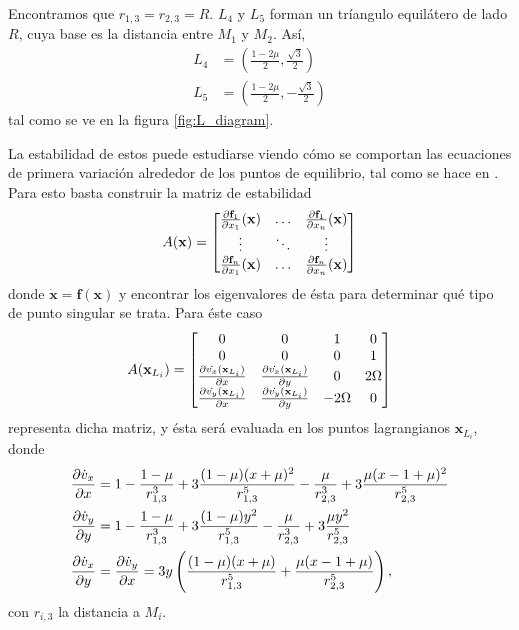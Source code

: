 Encontramos que $r_{1,3} = r_{2,3} = R$. $L_4$ y $L_5$ forman un tríangulo equilátero de lado $R$, cuya base es la distancia entre $M_1$ y $M_2$. Así,
\begin{align}
 L_4 &= \left( \frac{1 - 2\mu}{2}, \frac{\sqrt{3}}{2} \right) \\
 L_5 &= \left( \frac{1 - 2\mu}{2} , -\frac{\sqrt{3}}{2} \right)
 \label{eq:L4_L5}
\end{align} 
tal como se ve en la figura \ref{fig:L_diagram}.


La estabilidad de estos puede estudiarse viendo cómo se comportan las ecuaciones de primera variación alrededor de los puntos de equilibrio, tal como se hace en \cite{Cornish1998}. Para esto basta construir la matriz de estabilidad 
\begin{equation*}
 A(\mathbf{x}) = \begin{bmatrix}
  \frac{\partial \mathbf{f}_1}{\partial x_1}(\mathbf{x}) & \dots & \frac{\partial \mathbf{f}_1}{\partial x_n}(\mathbf{x}) \\
  \vdots & \ddots & \vdots \\ 
  \frac{\partial \mathbf{f}_n}{\partial x_1}(\mathbf{x}) & \dots & \frac{\partial \mathbf{f}_n}{\partial x_n} (\mathbf{x})
\end{bmatrix}
\end{equation*}
donde $\dot{\mathbf{x}} = \mathbf{f}(\mathbf{x})$ y encontrar los eigenvalores de ésta para determinar qué tipo de punto singular se trata. Para éste caso
\begin{equation}
 A(\mathbf{x}_{L_i}) = \begin{bmatrix}
  0 & 0 & 1 & 0 \\
  0 & 0 & 0 & 1 \\ 
  \frac{\partial \dot{v_x}(\mathbf{x}_{L_i})}{\partial x} & \frac{\partial \dot{v_x}(\mathbf{x}_{L_i})}{\partial y} & 0 & 2 \Omega \\
  \frac{\partial \dot{v_y}(\mathbf{x}_{L_i})}{\partial x} & \frac{\partial \dot{v_y}(\mathbf{x}_{L_i})}{\partial y} & -2\Omega & 0
\end{bmatrix}
\label{eq:stability_CR3BP}
\end{equation}
representa dicha matriz, y ésta será evaluada en los puntos lagrangianos $\mathbf{x}_{L_i}$, donde 
\begin{align}
 \frac{\partial \dot{v}_x}{\partial x} &=  1 - \frac{1-\mu}{r_{1,3}^3} + 3\frac{(1-\mu)(x + \mu)^2}{r_{1,3}^5} - \frac{\mu}{r_{2,3}^3} + 3\frac{\mu(x - 1 + \mu)^2}{r_{2,3}^5} \nonumber \\ 
 \frac{\partial \dot{v}_y}{\partial y} &= 1 - \frac{1-\mu}{r_{1,3}^3} + 3\frac{(1-\mu)y^2}{r_{1,3}^5} - \frac{\mu}{r_{2,3}^3} + 3\frac{\mu y^2}{r_{2,3}^5} \nonumber \\
 \frac{\partial \dot{v}_x}{\partial y} &= \frac{\partial \dot{v}_y}{\partial x} = 3 y \left( \frac{(1-\mu)(x+\mu)}{r_{1,3}^5} + \frac{\mu (x - 1 + \mu)}{r_{2,3}^5} \right),
 \label{eq:3body_stability}
\end{align}
con $r_{i,3}$ la distancia a $M_i$.

